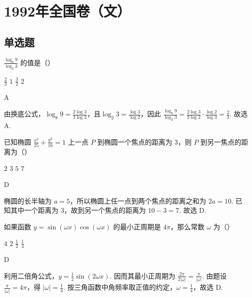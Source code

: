 \documentclass[UTF8,a4paper,oneside,11pt]{ctexbook}
\begin{document}
\mainmatter

\chapter{1992年全国卷（文）}
\section{单选题}

\begin{problem}
\(\frac{\log_8 9}{\log_2 3}\) 的值是（\quad）

\choices
    {\(\frac{2}{3} \)}
    {\(1\)}
    {\(\frac{3}{2} \)}
    {\(2\)}

\begin{answer}
A
\end{answer}

\begin{solution}
由换底公式，\(\log_8 9=\frac{2\log 3}{3\log 2}\)，且\(\log_2 3=\frac{\log 3}{\log 2}\)，因此
\(\frac{\log_8 9}{\log_2 3}=\frac{2\log 3}{3\log 2}\cdot\frac{\log 2}{\log 3}=\frac{2}{3}\). 故选 A.
\end{solution}
\end{problem}

\begin{problem}
已知椭圆 \(\frac{x^2}{25} + \frac{y^2}{16} = 1\) 上一点 \(P\) 到椭圆一个焦点的距离为 \(3\)，则 \(P\) 到另一焦点的距离为（\quad）

\choices
    {\(2\)}
    {\(3\)}
    {\(5\)}
    {\(7\)}

\begin{answer}
D
\end{answer}

\begin{solution}
椭圆的长半轴为 \(a=5\)，所以椭圆上任一点到两个焦点的距离之和为 \(2a=10\). 已知其中一个距离为 \(3\)，故到另一个焦点的距离为 \(10-3=7\). 故选 D.
\end{solution}
\end{problem}

\begin{problem}
如果函数 \(y=\sin(\omega x)\cos(\omega x)\) 的最小正周期是 \(4\pi\)，那么常数 \(\omega\) 为（\quad）

\choices
    {\(4\)}
    {\(2\)}
    {\(\frac{1}{2} \)}
    {\(\frac{1}{4} \)}

\begin{answer}
D
\end{answer}

\begin{solution}
利用二倍角公式，\(y=\frac{1}{2}\sin(2\omega x)\). 因而其最小正周期为 \(\frac{2\pi}{2|\omega|}=\frac{\pi}{|\omega|}\). 由题设 \(\frac{\pi}{|\omega|}=4\pi\)，得 \(|\omega|=\frac{1}{4}\). 按三角函数中角频率取正值的约定，\(\omega=\frac{1}{4}\)，故选 D.
\end{solution}
\end{problem}
\end{document}

